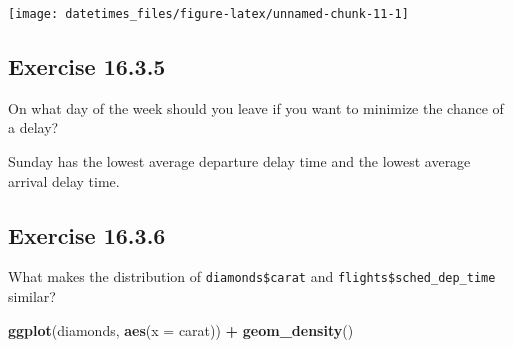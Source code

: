 \documentclass[]{book}
\newenvironment{Shaded}{\begin{snugshade}}{\end{snugshade}}
\newcommand{\CommentTok}[1]{\textcolor[rgb]{0.56,0.35,0.01}{\textit{#1}}}
\newcommand{\DataTypeTok}[1]{\textcolor[rgb]{0.13,0.29,0.53}{#1}}
\newcommand{\KeywordTok}[1]{\textcolor[rgb]{0.13,0.29,0.53}{\textbf{#1}}}
\newcommand{\NormalTok}[1]{#1}
\newcommand{\OperatorTok}[1]{\textcolor[rgb]{0.81,0.36,0.00}{\textbf{#1}}}
\newcommand{\OtherTok}[1]{\textcolor[rgb]{0.56,0.35,0.01}{#1}}
\newcommand{\StringTok}[1]{\textcolor[rgb]{0.31,0.60,0.02}{#1}}
\theoremstyle{plain}
\theoremstyle{remark}
\begin{document}
\begin{center}\texttt{[image: datetimes\_files/figure-latex/unnamed-chunk-11-1]} \end{center}

\hypertarget{exercise-16.3.5}{%
\subsection*{\texorpdfstring{Exercise
{16.3.5}}{Exercise 16.3.5}}\label{exercise-16.3.5}}

On what day of the week should you leave if you want to minimize the
chance of a delay?

Sunday has the lowest average departure delay time and the lowest
average arrival delay time.

\begin{Shaded}
\end{Shaded}

\hypertarget{exercise-16.3.6}{%
\subsection*{\texorpdfstring{Exercise
{16.3.6}}{Exercise 16.3.6}}\label{exercise-16.3.6}}

What makes the distribution of \texttt{diamonds\$carat} and
\texttt{flights\$sched\_dep\_time} similar?

\begin{Shaded}
\begin{Highlighting}[]
\KeywordTok{ggplot}\NormalTok{(diamonds, }\KeywordTok{aes}\NormalTok{(}\DataTypeTok{x =}\NormalTok{ carat)) }\OperatorTok{+}
\StringTok{  }\KeywordTok{geom_density}\NormalTok{()}
\end{Highlighting}
\end{Shaded}
\end{document}
